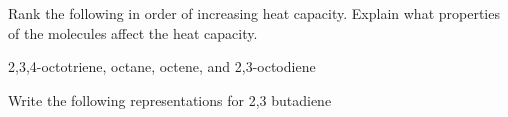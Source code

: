 \documentclass[10pt]{exam}
\begin{document}
\begin{questions}


\question Rank the following in order of increasing heat capacity.
Explain what properties of the molecules affect the heat capacity.

2,3,4-octotriene, octane, octene, and 2,3-octodiene


\question Write the following representations for 2,3 butadiene



\end{questions}
\end{document}
